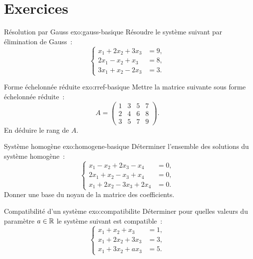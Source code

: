 \section*{Exercices}

\begin{exercise}{Résolution par Gauss \basic}{exo:gauss-basique}
  Résoudre le système suivant par élimination de Gauss~:
  \[
    \left\{
    \begin{aligned}
      x_1 + 2x_2 + 3x_3 &= 9,\\
      2x_1 - x_2 + x_3 &= 8,\\
      3x_1 + x_2 - 2x_3 &= 3.
    \end{aligned}
    \right.
  \]
\end{exercise}

\begin{exercise}{Forme échelonnée réduite \basic}{exo:rref-basique}
  Mettre la matrice suivante sous forme échelonnée réduite~:
  \[
    A=\begin{pmatrix}
      1 & 3 & 5 & 7\\
      2 & 4 & 6 & 8\\
      3 & 5 & 7 & 9
    \end{pmatrix}.
  \]
  En déduire le rang de $A$.
\end{exercise}

\begin{exercise}{Système homogène \basic}{exo:homogene-basique}
  Déterminer l'ensemble des solutions du système homogène~:
  \[
    \left\{
    \begin{aligned}
      x_1 - x_2 + 2x_3 - x_4 &= 0,\\
      2x_1 + x_2 - x_3 + x_4 &= 0,\\
      x_1 + 2x_2 - 3x_3 + 2x_4 &= 0.
    \end{aligned}
    \right.
  \]
  Donner une base du noyau de la matrice des coefficients.
\end{exercise}

\begin{exercise}{Compatibilité d'un système \basic}{exo:compatibilite}
  Déterminer pour quelles valeurs du paramètre $a\in{\mathbb{R}}$ le système
  suivant est compatible~:
  \[
    \left\{
    \begin{aligned}
      x_1 + x_2 + x_3 &= 1,\\
      x_1 + 2x_2 + 3x_3 &= 3,\\
      x_1 + 3x_2 + ax_3 &= 5.
    \end{aligned}
    \right.
  \]
\end{exercise}

